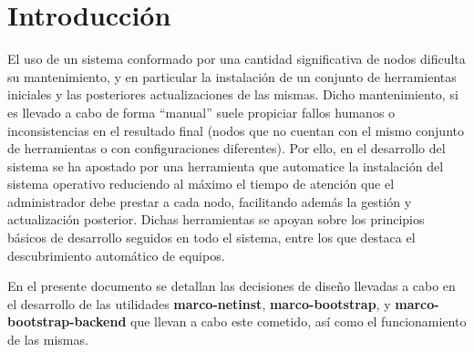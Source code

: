 \documentclass{article}
\title{\hmwkTitle}
\author{\textbf{\hmwkAuthorName}}
\date{\hmwkDueDate}
\begin{document}
\maketitle
\begin{abstract}
El paquete Marcobootstrap comprende un conjunto de utilidades que permite llevar a cabo la descarga, instalación y actualización de un sistema operativo en varios nodos sin requerir la supervisión de un administrador, incluyendo el descubrimiento de los equipos necesarios para el desarrollo de dichas operaciones. Junto a estas se incluye una serie de aplicaciones de gestión del sistema utilizables por el administrador del sistema.
\end{abstract}



\tableofcontents
\newpage

\section{Introducción}

El uso de un sistema conformado por una cantidad significativa de nodos dificulta su mantenimiento, y en particular la instalación de un conjunto de herramientas iniciales y las posteriores actualizaciones de las mismas. Dicho mantenimiento, si es llevado a cabo de forma ``manual'' suele propiciar fallos humanos o inconsistencias en el resultado final (nodos que no cuentan con el mismo conjunto de herramientas o con configuraciones diferentes). Por ello, en el desarrollo del sistema se ha apostado por una herramienta que automatice la instalación del sistema operativo reduciendo al máximo el tiempo de atención que el administrador debe prestar a cada nodo, facilitando además la gestión y actualización posterior. Dichas herramientas se apoyan sobre los principios básicos de desarrollo seguidos en todo el sistema, entre los que destaca el descubrimiento automático de equipos.

En el presente documento se detallan las decisiones de diseño llevadas a cabo en el desarrollo de las utilidades \textbf{marco-netinst}, \textbf{marco-bootstrap}, y \textbf{marco-bootstrap-backend} que llevan a cabo este cometido, así como el funcionamiento de las mismas.
\end{document}
